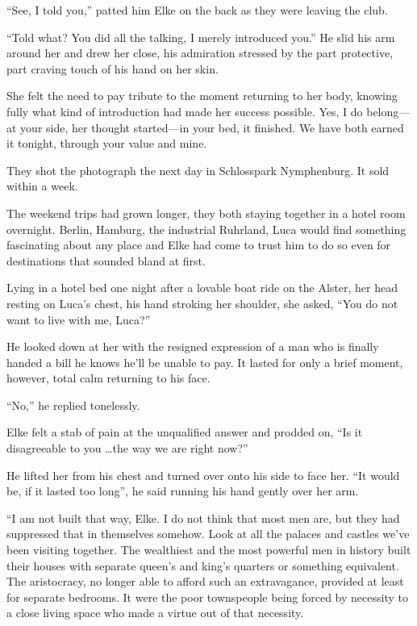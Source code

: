``See, I told you,'' patted him Elke on the back as they were leaving the club.

``Told what? You did all the talking, I merely introduced you.'' He slid his arm around her and drew her close, his admiration stressed by the part protective, part craving touch of his hand on her skin.

She felt the need to pay tribute to the moment returning to her body, knowing fully what kind of introduction had made her success possible. Yes, I do belong---at your side, her thought started---in your bed, it finished. We have both earned it tonight, through your value and mine.

They shot the photograph the next day in Schlosspark Nymphenburg. It sold within a week.

\sectionline

The weekend trips had grown longer, they both staying together in a hotel room overnight. Berlin, Hamburg, the industrial Ruhrland, Luca would find something fascinating about any place and Elke had come to trust him to do so even for destinations that sounded bland at first.

Lying in a hotel bed one night after a lovable boat ride on the Alster, her head resting on Luca's chest, his hand stroking her shoulder, she asked, ``You do not want to live with me, Luca?''

He looked down at her with the resigned expression of a man who is finally handed a bill he knows he'll be unable to pay. It lasted for only a brief moment, however, total calm returning to his face.

``No,'' he replied tonelessly.

Elke felt a stab of pain at the unqualified answer and prodded on, ``Is it disagreeable to you \ldots the way we are right now?''

He lifted her from his chest and turned over onto his side to face her. ``It would be, if it lasted too long'', he said running his hand gently over her arm.

``I am not built that way, Elke. I do not think that most men are, but they had suppressed that in themselves somehow. Look at all the palaces and castles we've been visiting together. The wealthiest and the most powerful men in history built their houses with separate queen's and king's quarters or something equivalent. The aristocracy, no longer able to afford such an extravagance, provided at least for separate bedrooms. It were the poor townspeople being forced by necessity to a close living space who made a virtue out of that necessity.

